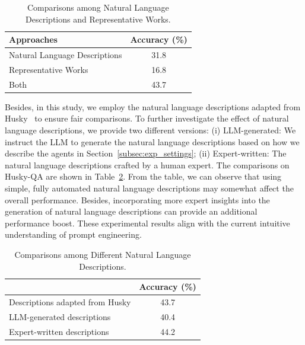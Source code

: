 \begin{table}[h]
\centering
\caption{Comparisons among Natural Language Descriptions and Representative Works.}
\label{table:exp_agent_descrption}
\begin{tabular}{lc}
\toprule
Approaches & Accuracy (\%) \\ \midrule
Natural Language Descriptions & 31.8 \\ 
Representative Works & 16.8 \\
Both & 43.7 \\
\bottomrule
\end{tabular}
\end{table}

Besides, in this study, we employ the natural language descriptions adapted from Husky~\cite{kim2024husky} to ensure fair comparisons. To further investigate the effect of natural language descriptions, we provide two different versions: (i) LLM-generated: We instruct the LLM to generate the natural language descriptions based on how we describe the agents in Section~\ref{subsec:exp_settings}; (ii) Expert-written: The natural language descriptions crafted by a human expert. The comparisons on Husky-QA are shown in Table~\ref{table:exp_agent_descrption_diff}. From the table, we can observe that using simple, fully automated natural language descriptions may somewhat affect the overall performance. Besides, incorporating more expert insights into the generation of natural language descriptions can provide an additional performance boost. These experimental results align with the current intuitive understanding of prompt engineering.
\begin{table}[h]
\centering
\caption{Comparisons among Different Natural Language Descriptions.}
\label{table:exp_agent_descrption_diff}
\begin{tabular}{lc}
\toprule
 & Accuracy (\%) \\ \midrule
Descriptions adapted from Husky & 43.7 \\ 
LLM-generated descriptions & 40.4 \\
Expert-written descriptions & 44.2 \\
\bottomrule
\end{tabular}
\end{table}





